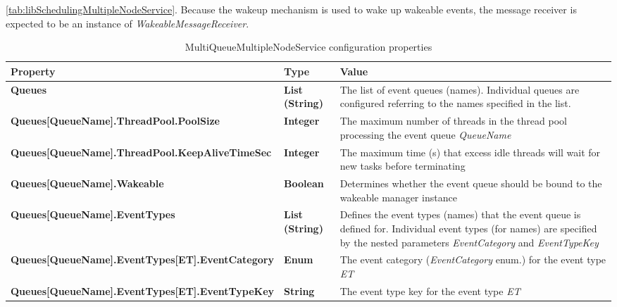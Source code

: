 \ref{tab:libSchedulingMultipleNodeService}. Because the wakeup mechanism is used to wake up wakeable events, the message receiver is expected to be an instance of \emph{WakeableMessageReceiver}.


\begin{table}
\scriptsize
\begin{center}
\begin{tabular}{p{6.3cm} p{0.9cm} p{7.3cm}}
	\hline
	\textbf{Property}											& \textbf{Type}						& \textbf{Value}					\\[1mm]
    \hline
	\textbf{Queues}												& \textbf{List (String)}			& The list of event queues (names). Individual queues are configured referring to the names specified in the list.		\\[1.5mm]	
	\textbf{Queues[QueueName].ThreadPool.PoolSize}				& \textbf{Integer}					& The maximum number of threads in the thread pool processing the event queue \emph{QueueName}		\\[1.5mm]	
	\textbf{Queues[QueueName].ThreadPool.KeepAliveTimeSec}		& \textbf{Integer}					& The maximum time (s) that excess idle threads will wait for new tasks before terminating			\\[1.5mm]	
	\textbf{Queues[QueueName].Wakeable}							& \textbf{Boolean}					& Determines whether the event queue should be bound to the wakeable manager instance					\\[1.5mm]	
	\textbf{Queues[QueueName].EventTypes}						& \textbf{List (String)}			& Defines the event types (names) that the event queue is defined for. Individual event types (for names) are specified by the nested parameters \emph{EventCategory} and \emph{EventTypeKey}			\\[1.5mm]	
	\textbf{Queues[QueueName].EventTypes[ET].EventCategory}		& \textbf{Enum}					& The event category (\emph{EventCategory} enum.) for the event type \emph{ET}						\\[1.5mm]	
	\textbf{Queues[QueueName].EventTypes[ET].EventTypeKey}		& \textbf{String}					& The event type key for the event type \emph{ET}						\\[1.5mm]	
    \hline
\end{tabular}
\end{center}
\caption{MultiQueueMultipleNodeService configuration properties}
\label{tab:libMultiQueueMultipleNodeService}
\end{table}

